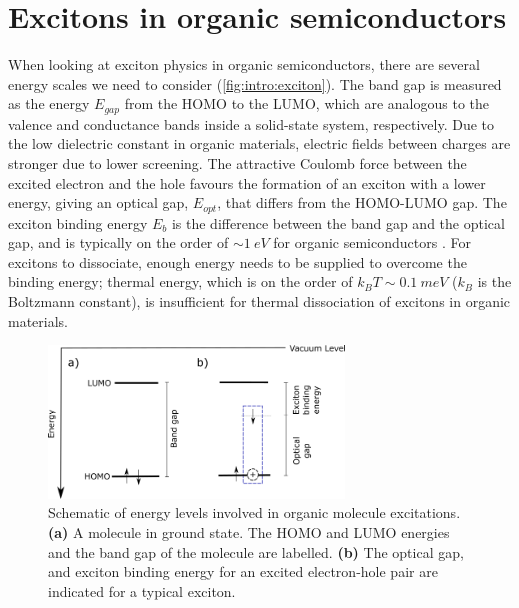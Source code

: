 \section{Excitons in organic semiconductors}

When looking at exciton physics in organic semiconductors, there are several energy scales we need to consider (\autoref{fig:intro:exciton}). The band gap is measured as the energy $E_{gap}$ from the \ac{HOMO} to the \ac{LUMO}, which are analogous to the valence and conductance bands inside a solid-state system, respectively.  Due to the low dielectric constant in organic materials, electric fields between charges are stronger due to lower screening. The attractive Coulomb force between the excited electron and the hole favours the formation of an exciton with a lower energy, giving an optical gap, $E_{opt}$, that differs from the HOMO-LUMO gap. The exciton binding energy $E_b$ is the difference between the band gap and the optical gap, and is typically on the order of $\sim \SI{1}{eV}$ for organic semiconductors \citep{knupfer2003exciton}. For excitons to dissociate, enough energy needs to be supplied to overcome the binding energy; thermal energy, which is on the order of $k_B T \sim \SI{0.1}{meV}$ ($k_B$ is the Boltzmann constant), is insufficient for thermal dissociation of excitons in organic materials.


\begin{figure}[h]
    \centering
    \includegraphics[width=0.7\textwidth]{pictures/exciton_energy.png}
    \caption{Schematic of energy levels involved in organic molecule excitations. \textbf{(a)} A molecule in ground state. The HOMO and LUMO energies and the band gap of the molecule are labelled. \textbf{(b)} The optical gap, and exciton binding energy for an excited electron-hole pair are indicated for a typical exciton.}
    \label{fig:intro:exciton}
\end{figure}

